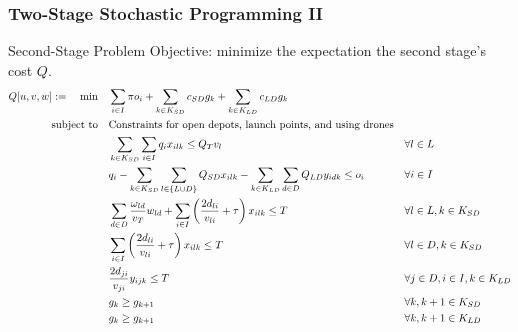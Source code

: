 \documentclass[aspectratio=169]{beamer}
\begin{document}
\begin{frame}
    \frametitle{Two-Stage Stochastic Programming II}
    \begin{alertblock}{Second-Stage Problem}
    \small
    Objective: minimize the expectation the second stage's cost $Q$.
    \tiny
    \vspace{-5pt}
    \begin{subequations} \label{formulation:2ndStage}
        \begin{align}
            Q[u,v,w] :=  \quad \min \quad & \sum_{i \in I} \pi o_i + \sum_{k \in K_{SD}} c_{SD} g_k + \sum_{k \in K_{LD}} c_{LD} g_k & & \label{objective:2ndStageObj} \\
                         \operatorname{subject~to} \quad & \text{Constraints for open depots, launch points, and using drones} \\
                                          & \sum_{k \in K_{SD}} \sum_{i \in I} q_i x_{ilk} \leq Q_T v_l && \forall l \in L \label{constraint:TrucksCapacity} \\
                                          & q_i - \sum_{k \in K_{SD}}\sum_{l \in \{L \cup D\}} Q_{SD} x_{ilk} - \sum_{k \in K_{LD}}\sum_{d \in D} Q_{LD} y_{idk} \leq o_i && \forall i \in I \label{constraint:UnmetDemand} \\
                                          & \sum_{d \in D} \frac{\omega_{ld}}{v_T} w_{ld} + \sum_{i \in I} \left( \frac{2d_{li}}{v_{li}} + \tau \right) x_{ilk} \leq T && \forall l \in L, k \in K_{SD} \label{constraint:LPTimeLimitSD} \\
                                          & \sum_{i \in I} \left( \frac{2d_{li}}{v_{li}} + \tau \right) x_{ilk} \leq T && \forall l \in D, k \in K_{SD} \label{constraint:DepotTimeLimitSD} \\
                                          & \frac{2d_{ji}}{v_{ji}} y_{ijk} \leq T && \forall j \in D, i \in I, k \in K_{LD} \label{constraint:DepotTimeLimitLD} \\
                                          & g_k \geq g_{k+1} && \forall k, k+1 \in K_{SD} \label{constraint:SD_Remove_Symmetry} \\
                                          & g_k \geq g_{k+1} && \forall k, k+1 \in K_{LD} \label{constraint:LD_Remove_Symmetry} 
        \end{align}
    \end{subequations}
    \end{alertblock}
\end{frame}
\end{document}
